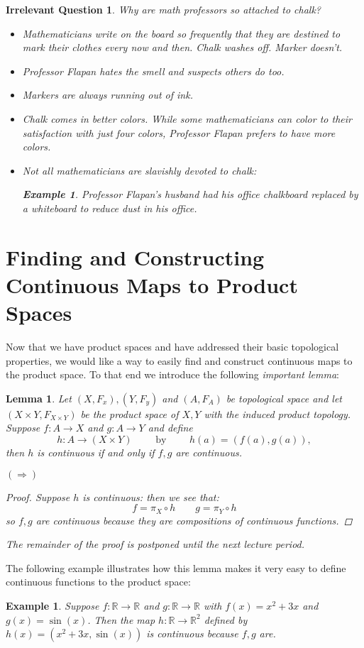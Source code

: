 \documentclass[reqno]{amsart}
\newcommand{\reals}{\mathbb{R}}
\newtheorem{lemma}[theorem]{Lemma}
\newtheorem{example}[theorem]{Example}
\newtheorem{irrevquestion}[theorem]{Irrelevant Question}
\begin{document}
\begin{irrevquestion}
Why are math professors so attached to chalk?

\begin{itemize}
\item Mathematicians write on the board so frequently that they are destined to mark their clothes every now and then. Chalk washes off. Marker doesn't.
\item Professor Flapan hates the smell and suspects others do too.
\item Markers are always running out of ink.
\item Chalk comes in better colors. While some mathematicians can color to their satisfaction with just four colors, Professor Flapan prefers to have more colors.
\item Not all mathematicians are slavishly devoted to chalk:
\begin{example}
Professor Flapan's husband had his office chalkboard replaced by a whiteboard to reduce dust in his office.
\end{example}
\end{itemize}
\end{irrevquestion}

\section{Finding and Constructing Continuous Maps to Product Spaces}

Now that we have product spaces and have addressed their basic topological properties, we would like a way to easily find and construct continuous maps to the product space. To that end we introduce the following \emph{important lemma}:
\begin{lemma}
Let $(X,F_x),(Y,F_y)$ and $(A,F_A)$ be topological space and let $(X\times Y,F_{X\times Y})$ be the product space of $X,Y$ with the induced product topology. Suppose $f:A\to X$ and $g:A\to Y$ and define
\[h:A\to(X\times Y) \qquad \text{ by } \qquad h(a) = (f(a),g(a)),\]
then $h$ is continuous if and only if $f,g$ are continuous.

$(\Rightarrow)$
\begin{proof}
Suppose $h$ is continuous: then we see that:
\[f = \pi_X \circ h \qquad g = \pi_Y \circ h\]
so $f,g$ are continuous because they are compositions of continuous functions.
\end{proof}
The remainder of the proof is postponed until the next lecture period.
\end{lemma}
The following example illustrates how this lemma makes it very easy to define continuous functions to the product space:
\begin{example}
Suppose $f:\reals\to\reals$ and $g:\reals\to\reals$ with $f(x) = x^2+3x$ and $g(x) = \sin(x)$. Then the map $h:\reals\to\reals^2$ defined by $h(x) = (x^2+3x, \sin(x))$ is continuous because $f,g$ are.
\end{example}
\end{document}
